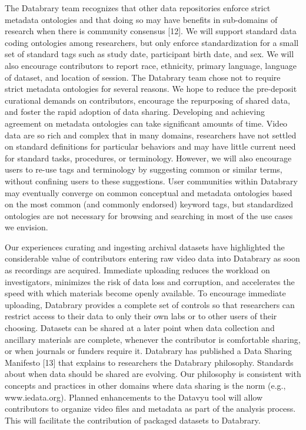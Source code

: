 \documentclass[letterpaper,man,apacite]{apa6}
\begin{document}
The Databrary team recognizes that other data repositories enforce strict metadata ontologies and that doing so may have benefits in sub-domains of research when there is community consensus [12]. 
We will support standard data coding ontologies among researchers, but only enforce standardization for a small set of standard tags such as study date, participant birth date, and sex. We will also encourage
contributors to report race, ethnicity, primary language, language of
dataset, and location of session. 
The Databrary team chose not to require strict metadata ontologies for several reasons. We hope to
reduce the pre-deposit curational demands on contributors, encourage the repurposing of shared data, and foster the rapid adoption of data sharing. 
Developing and achieving agreement on metadata ontologies can take significant amounts of time. 
Video data are so rich and complex that in many domains, researchers have not settled on standard definitions for particular behaviors and may have little current need for standard tasks, procedures, or terminology. 
However, we will also encourage users to re-use tags and terminology by suggesting common or similar terms, without confining users to these suggestions. 
User communities within Databrary may eventually converge on common conceptual and metadata ontologies based on the most common (and commonly endorsed) keyword tags, but standardized ontologies are not
necessary for browsing and searching in most of the use cases we
envision.

Our experiences curating and ingesting archival datasets have highlighted the considerable value of contributors entering raw video data into Databrary as soon as recordings are acquired. 
Immediate uploading reduces the workload on investigators, minimizes the risk of
data loss and corruption, and accelerates the speed with which materials
become openly available. 
To encourage immediate uploading, Databrary provides a complete set of controls so that researchers can restrict
access to their data to only their own labs or to other users of their
choosing. 
Datasets can be shared at a later point when data collection and ancillary materials are complete, whenever the contributor is comfortable sharing, or when journals or funders require it. 
Databrary has published a Data Sharing Manifesto [13] that explains to researchers the Databrary philosophy. Standards about when data should be shared are evolving. 
Our philosophy is consistent with concepts and practices in other domains where data sharing is the norm (e.g., www.iedata.org).
Planned enhancements to the Datavyu tool will allow contributors to organize video files and metadata as part of the analysis process. 
This will facilitate the contribution of packaged datasets to Databrary.
\end{document}
